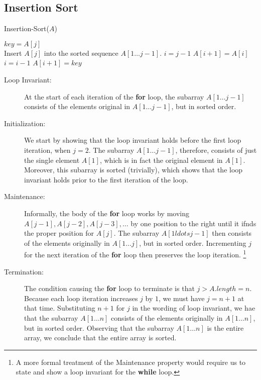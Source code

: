 \documentclass[12pt]{article}
\begin{document}
\begin{center}
    \section*{Insertion Sort}
\end{center}

\begin{algorithm}
    \caption{Insertion-Sort($A$)}
    \begin{algorithmic}
            \State $key = A[j]$ 
            \\ \Comment Insert $A[j]$ into the sorted sequence $A[1 \ldots j-1]$.
            \State $i = j-1$
                \State $A[i+1] = A[i]$
                \State $i = i - 1$
            \EndWhile
            \State $A[i+1] = key$
        \EndFor
    \end{algorithmic}
\end{algorithm}

\begin{description}
    \item[Loop Invariant:] At the start of each iteration of the \textbf{for} loop, the subarray $A[1 \ldots j-1 ]$ consists of the elements original in $A[1 \ldots j-1]$, but in sorted order.

    \item[Initialization:] We start by showing that the loop invariant holds before the first loop iteration, when $j=2$. The subarray $A[1 \ldots j-1]$, therefore, consists of just the single element $A[1]$, which is in fact the original element in $A[1]$. Moreover, this subarray is sorted (trivially), which shows that the loop invariant holds prior to the first iteration of the loop.

    \item[Maintenance:] Informally, the body of the \textbf{for} loop works by moving $A[j-1], A[j-2], A[j-3], \ldots$ by one position to the right until it ifnds the proper position for $A[j]$. The subarray $A[1 ldots j-1]$ then consists of the elements originally in $A[1 \ldots j]$, but in sorted order. Incrementing $j$ for the next iteration of the \textbf{for} loop then preserves the loop iteration.
    \footnote{A more formal treatment of the Maintenance property would require us to state and show a loop invariant for the \textbf{while} loop.}

    \item[Termination:] The condition causing the \textbf{for} loop to terminate is that $j > A.length = n$. Because each loop iteration increases $j$ by $1$, we must have $j = n + 1$ at that time. Substituting $n + 1$ for $j$ in the wording of loop invariant, we hae that the subarray $A[1 \ldots n]$ consists of the elements originally in $A[1 \ldots n]$,
    but in sorted order. Observing that the subarray $A[1 \ldots n]$ is the entire array, we conclude that the entire array is sorted.
\end{description}
\end{document}
